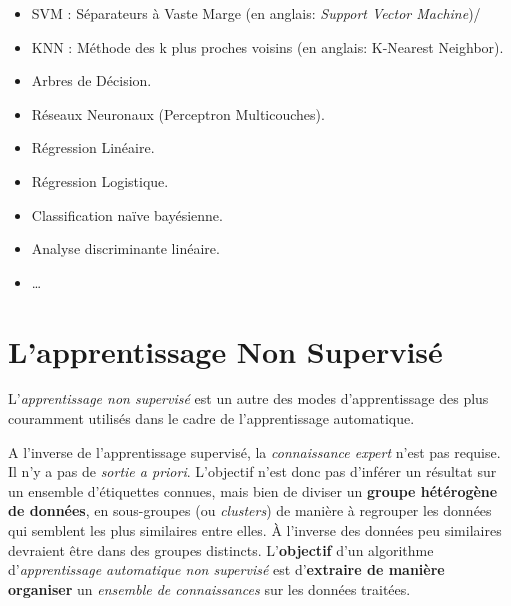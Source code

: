 \begin{itemize}
	\item SVM : Séparateurs à Vaste Marge (en anglais: \textit{Support Vector Machine})/\\
	
	\item KNN : Méthode des k plus proches voisins (en anglais:  K-Nearest Neighbor).\\
	
	\item Arbres de Décision.\\
	
	\item Réseaux Neuronaux (Perceptron Multicouches).\\
	
	\item Régression Linéaire.\\
	
	\item Régression Logistique.\\
	
	\item Classification naïve bayésienne.\\
	
	\item Analyse discriminante linéaire.\\
	
	\item  \ldots
	
\end{itemize}
\clearpage	
	
\section{L'apprentissage Non Supervisé}

L'\textit{apprentissage non supervisé} est un autre des modes d'apprentissage des plus couramment utilisés dans le cadre de l'apprentissage automatique.

A l'inverse de l'apprentissage supervisé, la \textit{connaissance expert} n'est pas requise. Il n'y a pas de \textit{sortie a priori}. L'objectif n'est donc pas d'inférer un résultat sur un ensemble d'étiquettes connues, mais bien de diviser un \textbf{groupe hétérogène de données}, en sous-groupes (ou \textit{clusters}) de manière à regrouper les données qui semblent les plus similaires entre elles. À l'inverse des données peu similaires devraient être dans des groupes distincts. L'\textbf{objectif} d'un algorithme d'\textit{apprentissage automatique non supervisé} est d'\textbf{extraire de manière organiser} un \textit{ensemble de connaissances} sur les données traitées.


